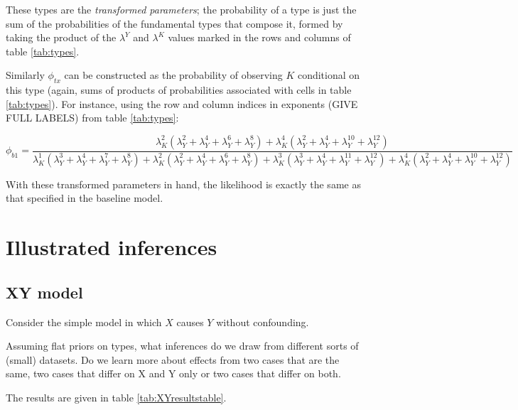 \documentclass[12pt,]{book}
\begin{document}
These types are the \emph{transformed parameters}; the probability of a type is just the sum of the probabilities of the fundamental types that compose it, formed by taking the product of the \(\lambda^Y\) and \(\lambda^K\) values marked in the rows and columns of table \ref{tab:types}.

Similarly \(\phi_{tx}\) can be constructed as the probability of observing \(K\) conditional on this type (again, sums of products of probabilities associated with cells in table \ref{tab:types}). For instance, using the row and column indices in exponents (GIVE FULL LABELS) from table \ref{tab:types}:

\[\phi_{b1}=\frac{\lambda_K^2(\lambda_Y^2+\lambda_Y^4+\lambda_Y^6+\lambda_Y^8)+\lambda_K^4(\lambda_Y^2+\lambda_Y^4+\lambda_Y^{10}+\lambda_Y^{12})}{
\lambda_K^1(\lambda_Y^3+\lambda_Y^4+\lambda_Y^7+\lambda_Y^8)+\lambda_K^2(\lambda_Y^2+\lambda_Y^4+\lambda_Y^6+\lambda_Y^8)+\lambda_K^3(\lambda_Y^3+\lambda_Y^4+\lambda_Y^11+\lambda_Y^{12})+\lambda_K^4(\lambda_Y^2+\lambda_Y^4+\lambda_Y^{10}+\lambda_Y^{12})}\]

With these transformed parameters in hand, the likelihood is exactly the same as that specified in the baseline model.

\hypertarget{illustrated-inferences}{%
\section{Illustrated inferences}\label{illustrated-inferences}}

\hypertarget{xy-model}{%
\subsection{XY model}\label{xy-model}}

Consider the simple model in which \(X\) causes \(Y\) without confounding.

Assuming flat priors on types, what inferences do we draw from different sorts of (small) datasets. Do we learn more about effects from two cases that are the same, two cases that differ on X and Y only or two cases that differ on both.

The results are given in table \ref{tab:XYresultstable}.
\end{document}
